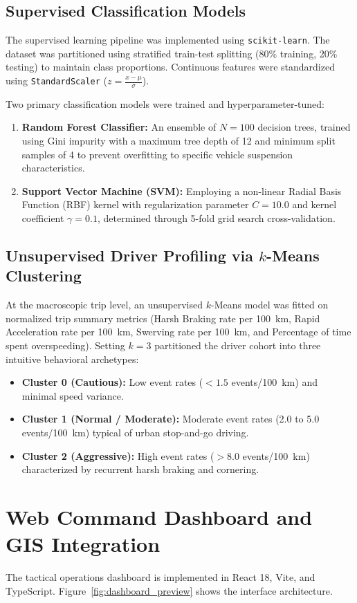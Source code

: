 \subsection{Supervised Classification Models}
The supervised learning pipeline was implemented using \texttt{scikit-learn}. The dataset was partitioned using stratified train-test splitting (80\% training, 20\% testing) to maintain class proportions. Continuous features were standardized using \texttt{StandardScaler} ($z = \frac{x - \mu}{\sigma}$).

Two primary classification models were trained and hyperparameter-tuned:
\begin{enumerate}
    \item \textbf{Random Forest Classifier:} An ensemble of $N=100$ decision trees, trained using Gini impurity with a maximum tree depth of 12 and minimum split samples of 4 to prevent overfitting to specific vehicle suspension characteristics.
    \item \textbf{Support Vector Machine (SVM):} Employing a non-linear Radial Basis Function (RBF) kernel with regularization parameter $C=10.0$ and kernel coefficient $\gamma = 0.1$, determined through 5-fold grid search cross-validation.
\end{enumerate}

\subsection{Unsupervised Driver Profiling via $k$-Means Clustering}
At the macroscopic trip level, an unsupervised $k$-Means model was fitted on normalized trip summary metrics (Harsh Braking rate per 100~km, Rapid Acceleration rate per 100~km, Swerving rate per 100~km, and Percentage of time spent overspeeding). Setting $k=3$ partitioned the driver cohort into three intuitive behavioral archetypes:
\begin{itemize}
    \item \textbf{Cluster 0 (Cautious):} Low event rates ($<1.5$ events/100~km) and minimal speed variance.
    \item \textbf{Cluster 1 (Normal / Moderate):} Moderate event rates (2.0 to 5.0 events/100~km) typical of urban stop-and-go driving.
    \item \textbf{Cluster 2 (Aggressive):} High event rates ($>8.0$ events/100~km) characterized by recurrent harsh braking and cornering.
\end{itemize}

\section{Web Command Dashboard and GIS Integration}
\label{sec:impl_dashboard}
The tactical operations dashboard is implemented in React 18, Vite, and TypeScript. Figure~\ref{fig:dashboard_preview} shows the interface architecture.

